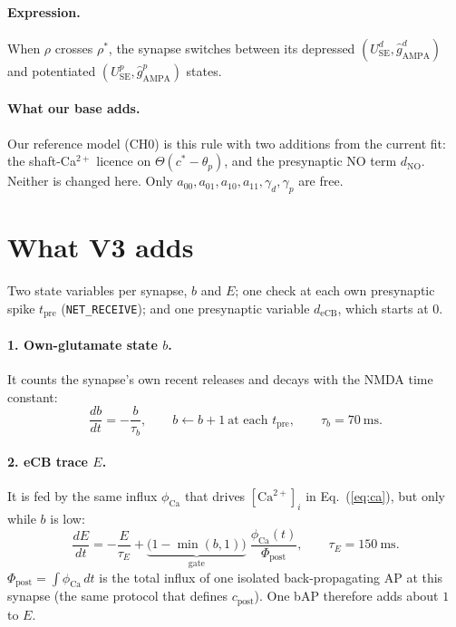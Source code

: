 \documentclass[11pt]{article}
\newcommand{\Ca}{[\mathrm{Ca}^{2+}]_i}
\newcommand{\cpost}{c_{\mathrm{post}}}
\newcommand{\USE}{U_{\mathrm{SE}}}
\newcommand{\gA}{\hat g_{\mathrm{AMPA}}}
\newcommand{\deCB}{d_{\mathrm{eCB}}}
\newcommand{\dNO}{d_{\mathrm{NO}}}
\newcommand{\phiCa}{\phi_{\mathrm{Ca}}}
\newcommand{\Phipost}{\Phi_{\mathrm{post}}}
\newcommand{\tpre}{t_{\mathrm{pre}}}
\begin{document}
\paragraph{Expression.} When $\rho$ crosses $\rho^*$, the synapse switches between its depressed
$(\USE^d,\gA^d)$ and potentiated $(\USE^p,\gA^p)$ states.

\paragraph{What our base adds.} Our reference model (CH0) is this rule with two additions from the current fit:
the shaft-Ca$^{2+}$ licence on $\Theta(c^*-\theta_p)$, and the presynaptic NO term $\dNO$. Neither is changed here.
Only $a_{00},a_{01},a_{10},a_{11},\gamma_d,\gamma_p$ are free.

\section{What V3 adds}
Two state variables per synapse, $b$ and $E$; one check at each own presynaptic spike $\tpre$
(\texttt{NET\_RECEIVE}); and one presynaptic variable $\deCB$, which starts at 0.

\paragraph{1. Own-glutamate state $b$.} It counts the synapse's own recent releases and decays with the NMDA time
constant:
\begin{equation}
\frac{db}{dt}=-\frac{b}{\tau_b},\qquad b\leftarrow b+1\ \text{at each }\tpre,\qquad \tau_b=70~\text{ms}.
\end{equation}

\paragraph{2. eCB trace $E$.} It is fed by the same influx $\phiCa$ that drives $\Ca$ in Eq.~(\ref{eq:ca}), but only
while $b$ is low:
\begin{equation}
\frac{dE}{dt}=-\frac{E}{\tau_E}+\underbrace{\bigl(1-\min(b,1)\bigr)}_{\text{gate}}\;\frac{\phiCa(t)}{\Phipost},
\qquad \tau_E=150~\text{ms}.
\end{equation}
$\Phipost=\int\phiCa\,dt$ is the total influx of one isolated back-propagating AP at this synapse (the same
protocol that defines $\cpost$). One bAP therefore adds about $1$ to $E$.
\end{document}
